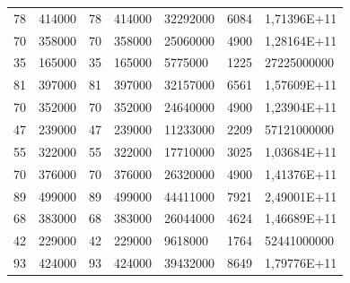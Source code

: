 \begin{enumerate}
\begin{table}
\begin{tabular}{lllllll}
78                    & 414000                 & 78                  & 414000              & 32292000                                    & 6084                    & 1,71396E+11             \\
70                    & 358000                 & 70                  & 358000              & 25060000                                    & 4900                    & 1,28164E+11             \\
35                    & 165000                 & 35                  & 165000              & 5775000                                     & 1225                    & 27225000000             \\
81                    & 397000                 & 81                  & 397000              & 32157000                                    & 6561                    & 1,57609E+11             \\
70                    & 352000                 & 70                  & 352000              & 24640000                                    & 4900                    & 1,23904E+11             \\
47                    & 239000                 & 47                  & 239000              & 11233000                                    & 2209                    & 57121000000             \\
55                    & 322000                 & 55                  & 322000              & 17710000                                    & 3025                    & 1,03684E+11             \\
70                    & 376000                 & 70                  & 376000              & 26320000                                    & 4900                    & 1,41376E+11             \\
89                    & 499000                 & 89                  & 499000              & 44411000                                    & 7921                    & 2,49001E+11             \\
68                    & 383000                 & 68                  & 383000              & 26044000                                    & 4624                    & 1,46689E+11             \\
42                    & 229000                 & 42                  & 229000              & 9618000                                     & 1764                    & 52441000000             \\
93                    & 424000                 & 93                  & 424000              & 39432000                                    & 8649                    & 1,79776E+11             \\

\end{tabular}
\end{table}
\end{enumerate}
